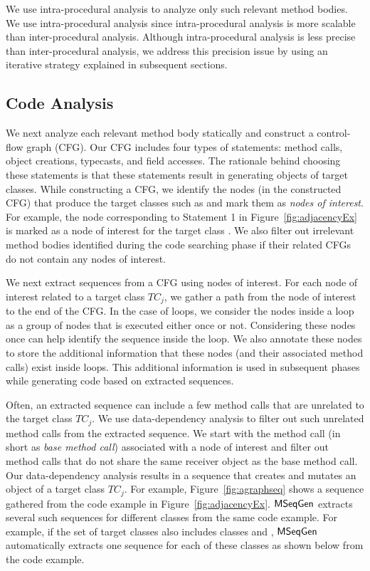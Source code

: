 \documentclass{sig-alternate}
\begin{document}
We use intra-procedural analysis to analyze only such relevant method bodies. We use intra-procedural analysis since intra-procedural analysis is more scalable than inter-procedural analysis. Although intra-procedural analysis is less precise than inter-procedural analysis, we address this precision issue by using an iterative strategy explained in subsequent sections. 


\subsection{Code Analysis} 

We next analyze each relevant method body statically and construct a control-flow graph (CFG). Our CFG includes four
types of statements: method calls, object creations, typecasts, and field accesses. The rationale behind choosing these statements is that these statements result in generating objects of target classes. While constructing a CFG, we identify the nodes (in the constructed CFG) that produce the target classes such as  and mark them as \emph{nodes of interest}. For example, the node corresponding to Statement 1 in Figure~\ref{fig:adjacencyEx} is marked as a node of interest for the target class . We also filter out irrelevant method bodies identified during the code searching phase if their related CFGs do not contain any nodes of interest.

We next extract sequences from a CFG using nodes of interest. For each node of interest related to a target class $TC_j$, we gather a path from the node of interest to the end of the CFG. In the case of loops, we consider the nodes inside a loop as a group of nodes that is executed either once or not. Considering these nodes once can help identify the sequence inside the loop. We also annotate these nodes to store the additional information that these nodes (and their associated method calls) exist inside loops. This additional information is used in subsequent phases while generating code based on extracted sequences.

Often, an extracted sequence can include a few method calls that are unrelated to the target class $TC_j$. We use data-dependency analysis to filter out such unrelated method calls from the extracted sequence. We start with the method call (in short as \emph{base method call}) associated with a node of interest and filter out method calls that do not share the same receiver object as the base method call. Our data-dependency analysis results in a sequence that creates and mutates an object of a target class $TC_j$. For example, Figure~\ref{fig:agraphseq} shows a sequence gathered from the code example in Figure~\ref{fig:adjacencyEx}. $\textsf{MSeqGen} $ extracts several such  sequences for different classes from the same code example. For example, if the set of target classes also includes classes  and , $\textsf{MSeqGen} $ automatically extracts one  sequence for each of these classes as shown below from the code example. 
\end{document}
